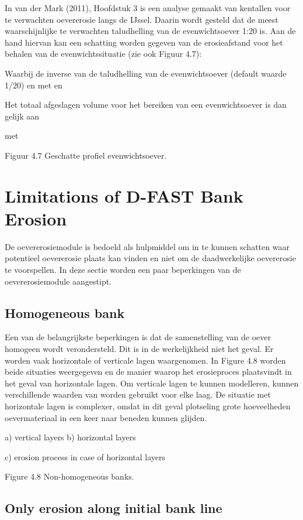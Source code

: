 In van der Mark (2011), Hoofdstuk 3 is een analyse gemaakt van kentallen voor te verwachten oevererosie langs de IJssel.
Daarin wordt gesteld dat de meest waarschijnlijke te verwachten taludhelling van de evenwichtsoever 1:20 is.
Aan de hand hiervan kan een schatting worden gegeven van de erosieafstand   voor het behalen van de evenwichtssituatie (zie ook Figuur 4.7):
	
Waarbij   de inverse van de taludhelling van de evenwichtsoever (default waarde 1/20) en   met   en
	
Het totaal afgeslagen volume voor het bereiken van een evenwichtsoever is dan gelijk aan

	
met


Figuur 4.7	Geschatte profiel evenwichtsoever.

\section{Limitations of D-FAST Bank Erosion}

De oevererosiemodule is bedoeld als hulpmiddel om in te kunnen schatten waar potentieel oevererosie plaats kan vinden en niet om de daadwerkelijke oevererosie te voorspellen.
In deze sectie worden een paar beperkingen van de oevererosiemodule aangestipt.

\subsection{Homogeneous bank}

Een van de belangrijkste beperkingen is dat de samenstelling van de oever homogeen wordt verondersteld.
Dit is in de werkelijkheid niet het geval.
Er worden vaak horizontale of verticale lagen waargenomen.
In Figure 4.8 worden beide situaties weergegeven en de manier waarop het erosieproces plaatsvindt in het geval van horizontale lagen.
Om verticale lagen te kunnen modelleren, kunnen verschillende waarden van   worden gebruikt voor elke laag.
De situatie met horizontale lagen is complexer, omdat in dit geval plotseling grote hoeveelheden oevermateriaal in een keer naar beneden kunnen glijden.


a) vertical layers						b) horizontal layers


c) erosion process in case of horizontal layers

Figure 4.8 Non-homogeneous banks.


\subsection{Only erosion along initial bank line}

